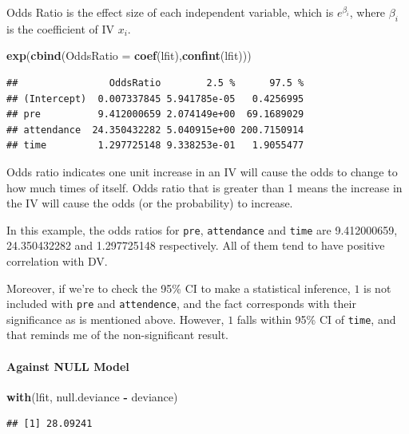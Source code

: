 \documentclass[
]{ctexart}
\newenvironment{Shaded}{\begin{snugshade}}{\end{snugshade}}
\newcommand{\AttributeTok}[1]{\textcolor[rgb]{0.13,0.29,0.53}{#1}}
\newcommand{\FunctionTok}[1]{\textcolor[rgb]{0.13,0.29,0.53}{\textbf{#1}}}
\newcommand{\NormalTok}[1]{#1}
\newcommand{\SpecialCharTok}[1]{\textcolor[rgb]{0.81,0.36,0.00}{\textbf{#1}}}
\begin{document}
Odds Ratio is the effect size of each independent variable, which is
\(e^{\beta_i}\), where \(\beta_i\) is the coefficient of IV \(x_i\).

\begin{Shaded}
\begin{Highlighting}[]
\FunctionTok{exp}\NormalTok{(}\FunctionTok{cbind}\NormalTok{(}\AttributeTok{OddsRatio =} \FunctionTok{coef}\NormalTok{(lfit),}\FunctionTok{confint}\NormalTok{(lfit)))}
\end{Highlighting}
\end{Shaded}

\begin{verbatim}
##                OddsRatio        2.5 %      97.5 %
## (Intercept)  0.007337845 5.941785e-05   0.4256995
## pre          9.412000659 2.074149e+00  69.1689029
## attendance  24.350432282 5.040915e+00 200.7150914
## time         1.297725148 9.338253e-01   1.9055477
\end{verbatim}

Odds ratio indicates one unit increase in an IV will cause the odds to
change to how much times of itself. Odds ratio that is greater than 1
means the increase in the IV will cause the odds (or the probability) to
increase.

In this example, the odds ratios for \texttt{pre}, \texttt{attendance}
and \texttt{time} are 9.412000659, 24.350432282 and 1.297725148
respectively. All of them tend to have positive correlation with DV.

Moreover, if we're to check the 95\% CI to make a statistical inference,
\(1\) is not included with \texttt{pre} and \texttt{attendence}, and the
fact corresponds with their significance as is mentioned above. However,
\(1\) falls within 95\% CI of \texttt{time}, and that reminds me of the
non-significant result.

\hypertarget{against-null-model}{%
\paragraph{Against NULL Model}\label{against-null-model}}

\begin{Shaded}
\begin{Highlighting}[]
\FunctionTok{with}\NormalTok{(lfit, null.deviance }\SpecialCharTok{{-}}\NormalTok{ deviance)}
\end{Highlighting}
\end{Shaded}

\begin{verbatim}
## [1] 28.09241
\end{verbatim}
\end{document}
